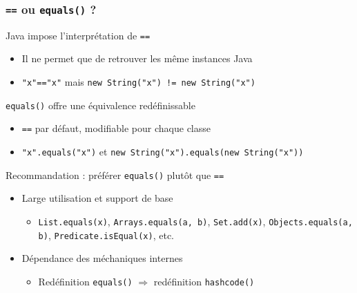 \documentclass[draft]{beamer}
\begin{document}
\begin{frame}
\frametitle{\lstinline{==} ou \lstinline{equals()} ?}
\begin{alertblock}{Java impose l'interprétation de \lstinline{==}}
 \begin{itemize}
  \item Il ne permet que de retrouver les même instances Java
  \item \small\lstinline{"x"=="x"} mais \lstinline{new String("x") != new String("x")}
 \end{itemize}
\end{alertblock}
\begin{exampleblock}{\lstinline{equals()} offre une équivalence redéfinissable}
 \begin{itemize}
  \item \lstinline{==} par défaut, modifiable pour chaque classe
  \item \scriptsize\lstinline{"x".equals("x")} et \lstinline{new String("x").equals(new String("x"))}
 \end{itemize}
\end{exampleblock}
\begin{block}{Recommandation : préférer \lstinline{equals()} plutôt que \lstinline{==}}
 \begin{itemize}
  \item Large utilisation et support de base
  \begin{itemize}
   \item \lstinline{List.equals(x)}, \lstinline{Arrays.equals(a, b)}, \lstinline{Set.add(x)}, \lstinline{Objects.equals(a, b)}, \lstinline{Predicate.isEqual(x)}, etc.
  \end{itemize}
  \item Dépendance des méchaniques internes
  \begin{itemize}
   \item Redéfinition \lstinline{equals()} $\Rightarrow$ redéfinition \lstinline{hashcode()}
  \end{itemize}
 \end{itemize}
\end{block}
\end{frame}
\end{document}
